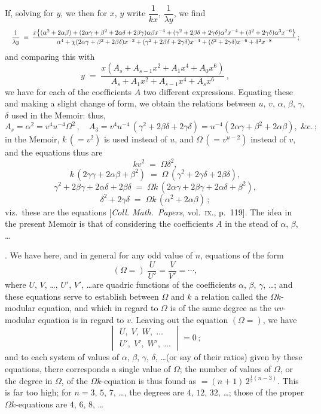 \documentclass[11pt]{article}
\begin{document}
\noindent If, solving for $y$, we then for $x$, $y$ write $\dfrac{1}{kx}$, $\dfrac{1}{\lambda y}$, we find
\[
\resizebox{\textwidth}{!}{$\displaystyle
\frac{1}{\lambda y} \;=\; \frac{x\bigl\{(\alpha^2 + 2\alpha\beta) + (2\alpha\gamma + \beta^2 + 2\alpha\delta + 2\beta\gamma)\alpha\beta x^{-4} + (\gamma^2 + 2\beta\delta + 2\gamma\delta)\alpha^2 x^{-4} + (\delta^2 + 2\gamma\delta)\alpha^3 x^{-6}\bigr\}}{\alpha^4 + \chi(2\alpha\gamma + \beta^2 + 2\beta\delta)x^{-2} + (\gamma^2 + 2\beta\delta + 2\gamma\delta)x^{-4} + (\delta^2 + 2\gamma\delta)x^{-6} + \delta^2 x^{-8}}\,;
$}
\]
and comparing this with
\[
y \;=\; \frac{x(A_s + A_{s-1}x^2 + A_1 x^4 + A_0 x^6)}{A_s + A_1 x^2 + A_{s-1}x^4 + A_s x^6}\,,
\]
we have for each of the coefficients $A$ two different expressions. Equating these and making a slight change of form, we obtain the relations between $u$, $v$, $\alpha$, $\beta$, $\gamma$, $\delta$ used in the Memoir: thus,
\[
A_s = \alpha^2 = v^4 u^{-4} \Omega^2\,,\quad A_3 = v^4 u^{-4}\,(\gamma^2 + 2\beta\delta + 2\gamma\delta) = u^{-4}(2\alpha\gamma + \beta^2 + 2\alpha\beta),\;\&\text{c.}\,;
\]
in the Memoir, $k\,(=v^2)$ is used instead of $u$, and $\Omega\,(=v^{u-2})$ instead of $v$, and the equations thus are
\[
k v^2 \;=\; \Omega \delta^2,
\]
\[
k\,(2\gamma\gamma + 2\alpha\beta + \beta^2) \;=\; \Omega\,(\gamma^2 + 2\gamma\delta + 2\beta\delta),
\]
\[
\gamma^2 + 2\beta\gamma + 2\alpha\delta + 2\beta\delta \;=\; \Omega k\,(2\alpha\gamma + 2\beta\gamma + 2\alpha\delta + \beta^2),
\]
\[
\delta^2 + 2\gamma\delta \;=\; \Omega k\,(\alpha^2 + 2\alpha\beta)\,;
\]
viz.\ these are the equations [\textit{Coll. Math.\ Papers}, vol.~\textsc{ix}., p.~119]. The idea in the present Memoir is that of considering the coefficients $A$ in the stead of $\alpha$, $\beta$, \ldots

\newpage

. We have here, and in general for any odd value of $n$, equations of the form
\[
(\Omega = )\;\frac{U}{U'} = \frac{V}{V'} = \cdots,
\]
where $U$, $V$, \ldots, $U'$, $V'$, \ldots are quadric functions of the coefficients $\alpha$, $\beta$, $\gamma$, \ldots; and these equations serve to establish between $\Omega$ and $k$ a relation called the $\Omega k$-modular equation, and which in regard to $\Omega$ is of the same degree as the $u v$-modular equation is in regard to $v$. Leaving out the equation $(\Omega =)$, we have
\[
\begin{vmatrix} U,\; V,\; W,\; \ldots \\ U',\; V',\; W',\; \ldots \end{vmatrix} = 0\,;
\]
and to each system of values of $\alpha$, $\beta$, $\gamma$, $\delta$, \ldots (or say of their ratios) given by these equations, there corresponds a single value of $\Omega$; the number of values of $\Omega$, or the degree in $\Omega$, of the $\Omega k$-equation is thus found as $=(n+1)\,2^{\frac{1}{2}(n-3)}$. This is far too high; for $n = 3$, $5$, $7$, \ldots, the degrees are $4$, $12$, $32$, \ldots; those of the proper $\Omega k$-equations are $4$, $6$, $8$, \ldots
\end{document}
